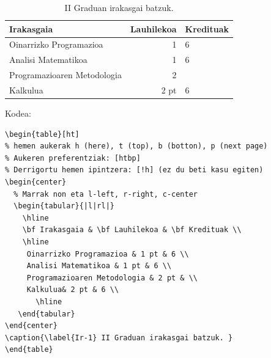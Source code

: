 \begin{table}[ht]
\begin{center}
   \begin{tabular}{|l|rl|}
      \hline \bf Irakasgaia & \bf Lauhilekoa & \bf Kredituak \\ \hline
              Oinarrizko Programazioa & 1 & 6 \\
              Analisi Matematikoa & 1  & 6 \\
              Programazioaren Metodologia & 2  & \\
              Kalkulua& 2 pt & 6 \\
       \hline
   \end{tabular}
\end{center}
\caption{\label{Ir-1} II Graduan irakasgai batzuk. }
\end{table}

\vspace{4 cm}

Kodea:

\vspace{0.5 cm}

\begin{minipage}{8cm}
\begin{verbatim}
\begin{table}[ht]
% hemen aukerak h (here), t (top), b (botton), p (next page)
% Aukeren preferentziak: [htbp]
% Derrigortu hemen ipintzera: [!h] (ez du beti kasu egiten)
\begin{center}
  % Marrak non eta l-left, r-right, c-center
  \begin{tabular}{|l|rl|} 
    \hline 
    \bf Irakasgaia & \bf Lauhilekoa & \bf Kredituak \\ 
    \hline
     Oinarrizko Programazioa & 1 pt & 6 \\
     Analisi Matematikoa & 1 pt & 6 \\
     Programazioaren Metodologia & 2 pt & \\
     Kalkulua& 2 pt & 6 \\
       \hline
   \end{tabular}
\end{center}
\caption{\label{Ir-1} II Graduan irakasgai batzuk. }
\end{table}
\end{verbatim}
\end{minipage}

